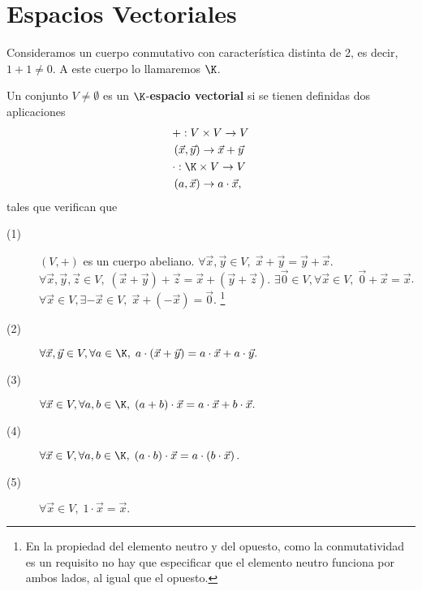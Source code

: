 \chapter{Espacios Vectoriales}

Consideramos un cuerpo conmutativo con característica distinta de 2, es decir, $\displaystyle 1 + 1 \neq 0 $. A este cuerpo lo llamaremos $\displaystyle \K $. 

\begin{fdefinition}
\normalfont Un conjunto $\displaystyle V \neq \emptyset $ es un $\displaystyle \K $-\textbf{espacio vectorial} si se tienen definidas dos aplicaciones 
\[
\begin{split}
& + : V \times V \to V \\ 
& \left(\vec{x}, \vec{y}\right) \to \vec{x} + \vec{y} \\
& \cdot : \K \times V \to V \\
& \left(a, \vec{x}\right) \to a \cdot \vec{x},
\end{split}
\]
tales que verifican que
\begin{description}
\item[(1)] $\displaystyle \left(V, +\right) $ es un cuerpo abeliano.
	\subitem[Commutatividad.] $\displaystyle \forall \vec{x}, \vec{y}\in V, \; \vec{x} + \vec{y} = \vec{y} + \vec{x}$.
	\subitem[Asociatividad.] $\displaystyle \forall \vec{x}, \vec{y}, \vec{z} \in V, \; \left(\vec{x} + \vec{y}\right) + \vec{z} = \vec{x} + \left(\vec{y} + \vec{z}\right). $ 
	 $\displaystyle \exists \vec{0} \in V, \forall \vec{x} \in V, \; \vec{0} + \vec{x} = \vec{x} $.
	 $\displaystyle \forall \vec{x}\in V, \exists -\vec{x} \in V, \; \vec{x} + \left(-\vec{x}\right) = \vec{0}. $ 
	\footnote{En la propiedad del elemento neutro y del opuesto, como la conmutatividad es un requisito no hay que especificar que el elemento neutro funciona por ambos lados, al igual que el opuesto.} 
\item[(2)] $\displaystyle \forall \vec{x}, \vec{y} \in V, \forall a \in \K, \; a \cdot \left(\vec{x} + \vec{y}\right) = a \cdot \vec{x} + a \cdot \vec{y}. $ 
\item[(3)] $\displaystyle \forall \vec{x} \in V, \forall a,b \in \K, \; \left(a + b\right) \cdot \vec{x} = a \cdot \vec{x} + b \cdot \vec{x}. $ 
\item[(4)] $\displaystyle \forall \vec{x} \in V, \forall a,b \in \K, \; \left(a \cdot b\right) \cdot \vec{x} = a \cdot \left(b \cdot \vec{x}\right). $ 
\item[(5)] $\displaystyle \forall \vec{x}\in V, \; 1 \cdot \vec{x}=\vec{x}. $ 
\end{description}
\end{fdefinition}

